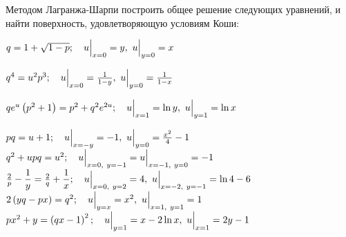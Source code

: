 \begin{multicols}{2}
\begin{enumtasks}

		\end{enumtasks}
	\end{multicols}

	Методом Лагранжа-Шарпи построить общее решение следующих уравнений, и найти поверхность, удовлетворяющую условиям Коши:

	\begin{enumtasks}

		\label{charpit_lagrange:cauchy_problems}
		\item \( q = 1 + \sqrt{1 - p}; \quad u \Bigl\vert \Bigr._{x = 0} = y, ~ u \Bigl\vert \Bigr._{y = 0} = x \) 														%
		\item \( q^4 = u^2 p^3; \quad u \Bigl\vert \Bigr._{x = 0} = \frac{1}{1 - y}, ~ u \Bigl\vert \Bigr._{y = 0} = \frac{1}{1 - x} \)									%
		\item \( qe^u \left( p^2+1 \right) = p^2 + q^2 e^{2u}; \quad u \Bigl\vert \Bigr._{x=1} = \ln{y}, ~ u \Bigl\vert \Bigr._{y=1} = \ln{x} \)									%
		\item \( pq = u + 1; \quad u \Bigl\vert \Bigr._{x = -y} = -1, ~ u \Bigl\vert \Bigr._{y = 0} = \frac{x^2}{4} - 1 \) 												%
		\itemstar \( q^2 + u pq = u^2; \quad u \Bigl\vert \Bigr._{x = 0, ~ y = -1} = u \Bigl\vert \Bigr._{x = -1, ~ y = 0} = -1 \)											%
		\itemstar \( \frac{2}{p} - \dfrac{1}{y} = \frac{2}{q} + \dfrac{1}{x}; \quad u \Bigl\vert \Bigr._{x=0, ~ y=2} = 4, ~ u \Bigl\vert \Bigr._{x=-2, ~ y=-1} = \ln{4} - 6 \)	%
		\itemstar \( 2 \left( yq - px \right) = q^2; \quad u \Bigl\vert \Bigr._{y = x} = x^2, ~ u \Bigl\vert \Bigr._{x=1, ~ y=1} = 1 \) 												%
		\itemstar \( px^2 + y = \left( qx-1 \right)^2; \quad u \Bigl\vert \Bigr._{y=1} = x - 2\ln{x}, ~ u \Bigl\vert \Bigr._{x=1} = 2y - 1 \)										%
		
	\end{enumtasks}
